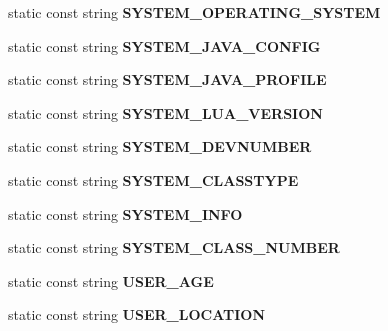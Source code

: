 \begin{CompactItemize}
\item 
static const string {\bf SYSTEM\_\-OPERATING\_\-SYSTEM}\label{classbr_1_1pucrio_1_1telemidia_1_1ginga_1_1ncl_1_1adaptation_1_1context_1_1ContextBase_dd2f1d672229a5ab354aba09f2f90b15}

\item 
static const string {\bf SYSTEM\_\-JAVA\_\-CONFIG}\label{classbr_1_1pucrio_1_1telemidia_1_1ginga_1_1ncl_1_1adaptation_1_1context_1_1ContextBase_39c5b04eb648c07a3808d22a805a2923}

\item 
static const string {\bf SYSTEM\_\-JAVA\_\-PROFILE}\label{classbr_1_1pucrio_1_1telemidia_1_1ginga_1_1ncl_1_1adaptation_1_1context_1_1ContextBase_8ca6883e5e5ce53878728b239f6547c9}

\item 
static const string {\bf SYSTEM\_\-LUA\_\-VERSION}\label{classbr_1_1pucrio_1_1telemidia_1_1ginga_1_1ncl_1_1adaptation_1_1context_1_1ContextBase_cb5496c3f38cbb9bb4dd16770ffc1b16}

\item 
static const string {\bf SYSTEM\_\-DEVNUMBER}\label{classbr_1_1pucrio_1_1telemidia_1_1ginga_1_1ncl_1_1adaptation_1_1context_1_1ContextBase_89f9f25aea66b6dd90e0f62a3e1e8610}

\item 
static const string {\bf SYSTEM\_\-CLASSTYPE}\label{classbr_1_1pucrio_1_1telemidia_1_1ginga_1_1ncl_1_1adaptation_1_1context_1_1ContextBase_b148fb1043981dddb564faccc029d7af}

\item 
static const string {\bf SYSTEM\_\-INFO}\label{classbr_1_1pucrio_1_1telemidia_1_1ginga_1_1ncl_1_1adaptation_1_1context_1_1ContextBase_d9c0c184a8b6bdda81d4f5f746aa5521}

\item 
static const string {\bf SYSTEM\_\-CLASS\_\-NUMBER}\label{classbr_1_1pucrio_1_1telemidia_1_1ginga_1_1ncl_1_1adaptation_1_1context_1_1ContextBase_993b6e1ae436b4f74f5f3205508a549d}

\item 
static const string {\bf USER\_\-AGE}\label{classbr_1_1pucrio_1_1telemidia_1_1ginga_1_1ncl_1_1adaptation_1_1context_1_1ContextBase_47c0b8a7ef9b8975f29cb645c03efbe3}

\item 
static const string {\bf USER\_\-LOCATION}\label{classbr_1_1pucrio_1_1telemidia_1_1ginga_1_1ncl_1_1adaptation_1_1context_1_1ContextBase_5a1b5f2d2abe8d55dd20123e78e5a24e}


\end{CompactItemize}
